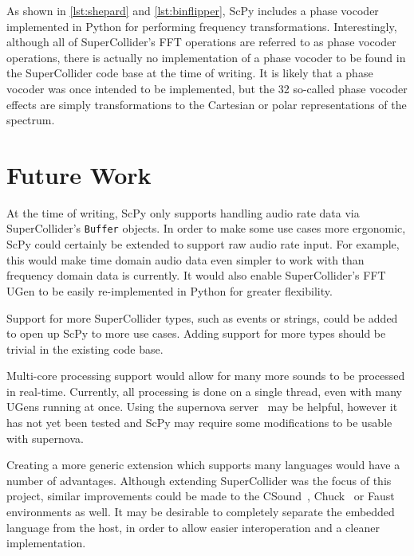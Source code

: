 \documentclass{article}
\begin{document}
As shown in \autoref{lst:shepard} and \autoref{lst:binflipper}, ScPy includes a phase vocoder
implemented in Python for performing frequency transformations. Interestingly, although all of
SuperCollider's FFT operations are referred to as phase vocoder operations, there is actually no
implementation of a phase vocoder to be found in the SuperCollider code base at the time of
writing. It is likely that a phase vocoder was once intended to be implemented, but the 32
so-called phase vocoder effects are simply transformations to the Cartesian or polar
representations of the spectrum.

\section{Future Work}

At the time of writing, ScPy only supports handling audio rate data via SuperCollider's
\texttt{Buffer} objects. In order to make some use cases more ergonomic, ScPy could certainly be
extended to support raw audio rate input. For example, this would make time domain audio data even
simpler to work with than frequency domain data is currently. It would also enable SuperCollider's
FFT UGen to be easily re-implemented in Python for greater flexibility.

Support for more SuperCollider types, such as events or strings, could be added to open up ScPy to
more use cases. Adding support for more types should be trivial in the existing code base.

Multi-core processing support would allow for many more sounds to be processed in real-time.
Currently, all processing is done on a single thread, even with many UGens running at once. Using
the supernova server~\cite{blechmann2005supernova} may be helpful, however it has not yet been
tested and ScPy may require some modifications to be usable with supernova.

Creating a more generic extension which supports many languages would have a number of advantages.
Although extending SuperCollider was the focus of this project, similar improvements could be made
to the CSound~\cite{boulanger2000csound,lazzarini2005extensions}, Chuck~\cite{wang2008chuck} or
Faust~\cite{orlarey2009faust} environments as well. It may be desirable to completely separate the
embedded language from the host, in order to allow easier interoperation and a cleaner
implementation.

\newpage\printbibliography{}
\end{document}
